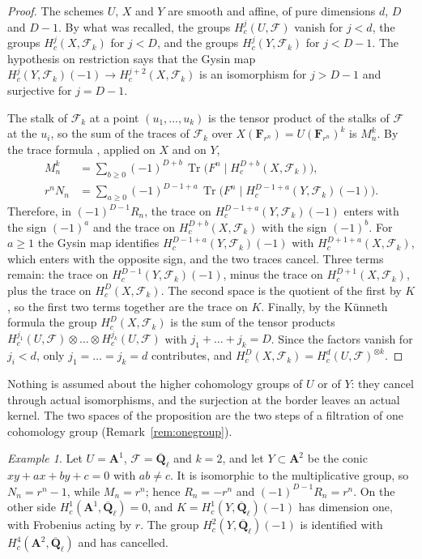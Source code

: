 \documentclass[11pt,a4paper]{article}
\theoremstyle{plain}
\theoremstyle{remark}
\newtheorem{example}[theorem]{Example}
\newcommand{\Ql}{\overline{\mathbf Q}_\ell}
\newcommand{\A}{\mathbf A}
\newcommand{\F}{\mathcal F}
\newcommand{\Tr}{\operatorname{Tr}}
\begin{document}
\begin{proof}
The schemes $U$, $X$ and $Y$ are smooth and affine, of pure dimensions $d$, $D$ and $D-1$. By what was recalled, the
groups $H^j_c(U,\F)$ vanish for $j<d$, the groups $H^j_c(X,\F_k)$ for $j<D$, and the groups $H^j_c(Y,\F_k)$ for
$j<D-1$. The hypothesis on restriction says that the Gysin map $H^j_c(Y,\F_k)(-1)\to H^{j+2}_c(X,\F_k)$ is an
isomorphism for $j>D-1$ and surjective for $j=D-1$.

The stalk of $\F_k$ at a point $(u_1,\dots,u_k)$ is the tensor product of the stalks of $\F$ at the $u_i$, so the
sum of the traces of $\F_k$ over $X(\mathbf F_{r^n})=U(\mathbf F_{r^n})^k$ is $M_n^k$. By the trace formula
\cite[Rapport, Th\'eor\`eme 3.2]{SGA4h}, applied on $X$ and on $Y$,
\begin{align*}
M_n^k&=\sum_{b\ge0}(-1)^{D+b}\,\Tr\bigl(F^n\mid H^{D+b}_c(X,\F_k)\bigr),\\
r^nN_n&=\sum_{a\ge0}(-1)^{D-1+a}\,\Tr\bigl(F^n\mid H^{D-1+a}_c(Y,\F_k)(-1)\bigr).
\end{align*}
Therefore, in $(-1)^{D-1}R_n$, the trace on $H^{D-1+a}_c(Y,\F_k)(-1)$ enters with the sign $(-1)^a$ and the
trace on $H^{D+b}_c(X,\F_k)$ with the sign $(-1)^b$. For $a\ge1$ the Gysin map identifies $H^{D-1+a}_c(Y,\F_k)(-1)$
with $H^{D+1+a}_c(X,\F_k)$, which enters with the opposite sign, and the two traces cancel. Three terms remain: the
trace on $H^{D-1}_c(Y,\F_k)(-1)$, minus the trace on $H^{D+1}_c(X,\F_k)$, plus the trace on $H^D_c(X,\F_k)$. The
second space is the quotient of the first by $K$, so the first two terms together are the trace on $K$. Finally, by
the K\"unneth formula \cite[XVII, 5.4.3]{SGA4} the group $H^D_c(X,\F_k)$ is the sum of the tensor products
$H^{j_1}_c(U,\F)\otimes\dots\otimes H^{j_k}_c(U,\F)$ with $j_1+\dots+j_k=D$. Since the factors vanish for $j_i<d$,
only $j_1=\dots=j_k=d$ contributes, and $H^D_c(X,\F_k)=H^d_c(U,\F)^{\otimes k}$.
\end{proof}

Nothing is assumed about the higher cohomology groups of $U$ or of $Y$: they cancel through actual isomorphisms, and
the surjection at the border leaves an actual kernel. The two spaces of the proposition are the two steps of a
filtration of one cohomology group (Remark~\ref{rem:onegroup}).

\begin{example}
Let $U=\A^1$, $\F=\Ql$ and $k=2$, and let $Y\subset\A^2$ be the conic $xy+ax+by+c=0$ with $ab\ne c$. It is
isomorphic to the multiplicative group, so $N_n=r^n-1$, while $M_n=r^n$; hence $R_n=-r^n$ and
$(-1)^{D-1}R_n=r^n$. On the other side $H^1_c(\A^1,\Ql)=0$, and $K=H^1_c(Y,\Ql)(-1)$ has dimension one, with
Frobenius acting by $r$. The group $H^2_c(Y,\Ql)(-1)$ is identified with $H^4_c(\A^2,\Ql)$ and has cancelled.
\end{example}
\end{document}

